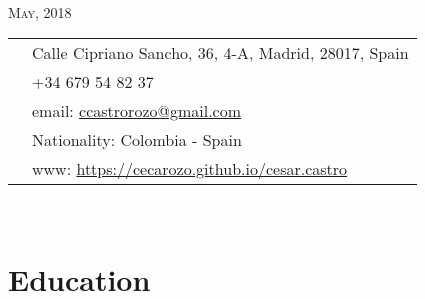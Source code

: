 \documentclass[11pt]{article}\usepackage[]{graphicx}\usepackage[]{color}
\begin{document}
\par{\\
\vspace{5pt}
{\color{headings} \scshape{May, 2018}}\\
\vspace{10pt}}

\colorbox{shade}{{
\begin{tabular}{c|p{13cm}}
\vspace{5pt}\raisebox{-4pt}{\textifsymbol{18}} & Calle Cipriano Sancho, 36, 4-A, Madrid, 28017, Spain\\
\vspace{5pt}\raisebox{-4pt}{\Mobilefone} & +34 679 54 82 37\\
\vspace{5pt}\raisebox{-4pt}{\Letter} & email: \href{mailto:ccastrorozo@gmail.com}{ccastrorozo@gmail.com} \\
\vspace{5pt}\raisebox{-4pt}{\Aquarius} & Nationality: Colombia - Spain\\
\vspace{5pt}\raisebox{-4pt}{\Mundus} & www: \href{https://cecarozo.github.io/cesar.castro}{https://cecarozo.github.io/cesar.castro}\\
\end{tabular}
}
}\\[10pt]


\section{Education} 
\end{document}
